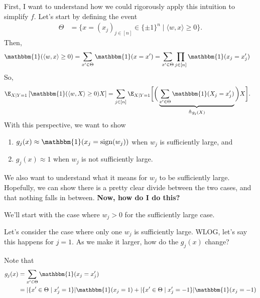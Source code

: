 \documentclass{article}
\begin{document}
First, I want to understand how we could rigorously apply this intuition to simplify $f$.
Let's start by defining the event
\begin{align}
  \Theta
  &= \big\{ x = (x_j)_{j\in[n]} \in \{ \pm 1 \}^n \mid \langle w, x \rangle \geq 0 \big\}.
\end{align}
Then,
\begin{align}
  \mathbbm{1}(\langle w, x \rangle \geq 0)
  &= \sum_{ x' \in \Theta } \mathbbm{1}(x = x')
  = \sum_{ x' \in \Theta } \prod_{j \in [n]} \mathbbm{1}(x_j = x_j')
\end{align}
So,
\begin{align}
  \E_{X \mid Y=1}\left[ \mathbbm{1}(\langle w, X \rangle \geq 0) X \right]
  &= \sum_{j \in [n]} \E_{X \mid Y=1}\bigg[ \bigg( \underbrace{ \sum_{ x' \in \Theta } \mathbbm{1}(X_j = x_j') }_{\triangleq g_j(X)} \bigg) X \bigg].
\end{align}
With this perspective, we want to show
\begin{enumerate}
  \item $g_j(x) \approx \mathbbm{1}(x_j = \operatorname{sign}(w_j))$ when $w_j$ is sufficiently large, and
  \item $g_j(x) \approx 1$ when $w_j$ is not sufficiently large.
\end{enumerate}
We also want to understand what it means for $w_j$ to be sufficiently large.
Hopefully, we can show there is a pretty clear divide between the two cases, and that nothing falls in between.
\textbf{Now, how do I do this?}

We'll start with the case where $w_j > 0$ for the sufficiently large case.

Let's consider the case where only one $w_j$ is sufficiently large.
WLOG, let's say this happens for $j = 1$.
As we make it larger, how do the $g_j(x)$ change?

Note that
\begin{align}
  g_j(x)
  &= \sum_{ x' \in \Theta } \mathbbm{1}(x_j = x_j') \\
  &= | \{ x' \in \Theta \mid x_j' = 1 \} | \mathbbm{1}(x_j = 1) + | \{ x' \in \Theta \mid x_j' = -1 \} | \mathbbm{1}(x_j = -1)
\end{align}
\end{document}
